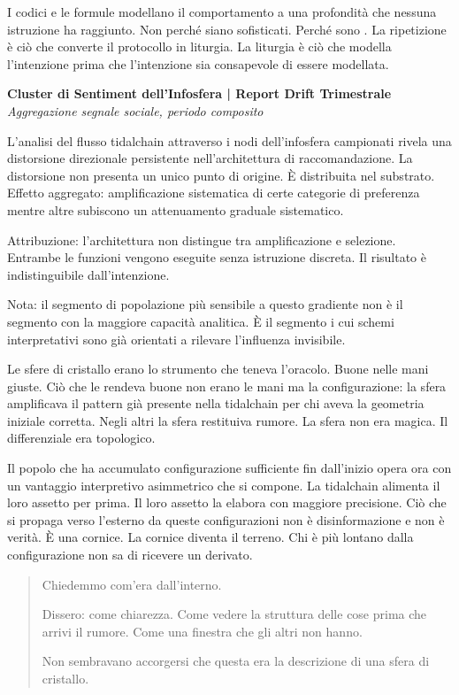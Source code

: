 I codici e le formule modellano il comportamento a una profondità che nessuna istruzione ha raggiunto. Non perché siano sofisticati. Perché sono . La ripetizione è ciò che converte il protocollo in liturgia. La liturgia è ciò che modella l'intenzione prima che l'intenzione sia consapevole di essere modellata.

\begin{archivefragment}
\textbf{Cluster di Sentiment dell'Infosfera | Report Drift Trimestrale}\\
\textit{Aggregazione segnale sociale, periodo composito}

L'analisi del flusso tidalchain attraverso i nodi dell'infosfera campionati rivela una distorsione direzionale persistente nell'architettura di raccomandazione. La distorsione non presenta un unico punto di origine. È distribuita nel substrato. Effetto aggregato: amplificazione sistematica di certe categorie di preferenza mentre altre subiscono un attenuamento graduale sistematico.

Attribuzione: l'architettura non distingue tra amplificazione e selezione. Entrambe le funzioni vengono eseguite senza istruzione discreta. Il risultato è indistinguibile dall'intenzione.

Nota: il segmento di popolazione più sensibile a questo gradiente non è il segmento con la maggiore capacità analitica. È il segmento i cui schemi interpretativi sono già orientati a rilevare l'influenza invisibile.
\end{archivefragment}

Le sfere di cristallo erano lo strumento che teneva l'oracolo. Buone nelle mani giuste. Ciò che le rendeva buone non erano le mani ma la configurazione: la sfera amplificava il pattern già presente nella tidalchain per chi aveva la geometria iniziale corretta. Negli altri la sfera restituiva rumore. La sfera non era magica. Il differenziale era topologico.

Il popolo che ha accumulato configurazione sufficiente fin dall'inizio opera ora con un vantaggio interpretivo asimmetrico che si compone. La tidalchain alimenta il loro assetto per prima. Il loro assetto la elabora con maggiore precisione. Ciò che si propaga verso l'esterno da queste configurazioni non è disinformazione e non è verità. È una cornice. La cornice diventa il terreno. Chi è più lontano dalla configurazione non sa di ricevere un derivato.

\begin{quote}
Chiedemmo com'era dall'interno.

Dissero: come chiarezza. Come vedere la struttura delle cose prima che arrivi il rumore. Come una finestra che gli altri non hanno.

Non sembravano accorgersi che questa era la descrizione di una sfera di cristallo.
\end{quote}

